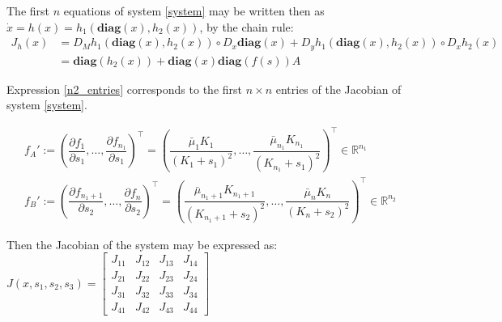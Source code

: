 \documentclass[3p,times]{elsarticle}
\newcommand{\R}{\mathbb{R}}
\newcommand{\diag}{\textbf{diag}}
\begin{document}
The first $n$ equations of system \eqref{system} may be written then as$\dot{x} =  h(x) = h_1(\diag(x), h_2(x))$, by the chain rule: 
\begin{align*} J_h(x) &= D_M h_1(\diag(x),h_2(x))\circ D_x \diag (x) + D_yh_1(\diag(x),h_2(x))\circ D_xh_2(x)  \\ &=
\diag(h_2(x))+\diag(x)\diag(f(s))A  \label{n2_entries}
\end{align*}

Expression \eqref{n2_entries} corresponds to the first $n\times n$ entries of the Jacobian of system \eqref{system}.

\begin{align*}
f_A' := \left( \dfrac{\partial f_1}{\partial s_1}, \dots, \dfrac{\partial f_{n_1}}{\partial s_1} \right)^\top = \left(\dfrac{\bar{\mu}_1K_1}{(K_1 + s_1)^2},\dots, \dfrac{\bar{\mu}_{n_1}K_{n_1}}{(K_{n_1} + s_1)^2} \right)^\top \in \R^{n_1} \\
f_B' := \left( \dfrac{\partial f_{n_1+1}}{\partial s_2}, \dots, \dfrac{\partial f_{n}}{\partial s_2} \right)^\top = \left( \dfrac{\bar{\mu}_{n_1+1}K_{n_1+1}}{(K_{n_1+1} + s_2)^2},\dots, \dfrac{\bar{\mu}_{n}K_{n}}{(K_{n} + s_2)^2} \right)^\top \in \R^{n_2}
\end{align*}

Then the Jacobian of the system may be expressed as:
$J(x,s_1,s_2,s_3) = \begin{bmatrix}
J_{11} & J_{12} & J_{13} & J_{14} \\
J_{21} & J_{22} & J_{23} & J_{24} \\
J_{31} & J_{32} & J_{33} & J_{34} \\
J_{41} & J_{42} & J_{43} & J_{44} 
\end{bmatrix} $
\end{document}
